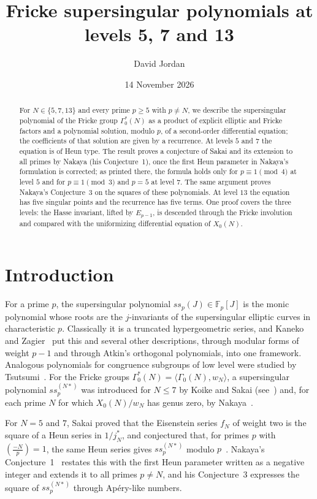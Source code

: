 \documentclass[11pt,a4paper]{article}
\title{Fricke supersingular polynomials at levels 5, 7 and 13}
\author{David Jordan}
\date{14 November 2026}
\theoremstyle{definition}
\theoremstyle{remark}
\newcommand{\F}{\mathbb{F}}
\newcommand{\leg}[2]{\left(\frac{#1}{#2}\right)}
\newcommand{\ssp}{\mathit{ss}_p}
\numberwithin{equation}{section}
\begin{document}
\maketitle

\begin{abstract}
For $N\in\{5,7,13\}$ and every prime $p\ge5$ with $p\ne N$, we describe the
supersingular polynomial of the Fricke group $\Gamma_0^*(N)$ as a product of
explicit elliptic and Fricke factors and a polynomial solution, modulo $p$, of a
second-order differential equation; the coefficients of that solution are given
by a recurrence. At levels $5$ and $7$ the equation is of Heun type. The
result proves a conjecture of Sakai and its extension to all primes by Nakaya
(his Conjecture~1), once the first Heun parameter in Nakaya's formulation is
corrected; as printed there, the formula holds only for $p\equiv1\pmod4$ at
level $5$ and for $p\equiv1\pmod3$ and $p=5$ at level $7$. The same
argument proves Nakaya's Conjecture~3 on the squares of these polynomials. At
level $13$ the equation has five singular points and the recurrence has five
terms. One proof covers the three levels: the Hasse invariant, lifted by
$E_{p-1}$, is descended through the Fricke involution and compared with the
uniformizing differential equation of $X_0(N)$.
\end{abstract}

\section{Introduction}\label{sec:intro}

For a prime $p$, the supersingular polynomial $\ssp(J)\in\F_p[J]$ is the monic
polynomial whose roots are the $j$-invariants of the supersingular elliptic
curves in characteristic $p$. Classically it is a truncated hypergeometric
series, and Kaneko and Zagier~\cite{KZ} put this and several other descriptions,
through modular forms of weight $p-1$ and through Atkin's orthogonal
polynomials, into one framework. Analogous polynomials for congruence subgroups
of low level were studied by Tsutsumi~\cite{Tsutsumi}. For the Fricke groups
$\Gamma_0^*(N)=\langle\Gamma_0(N),w_N\rangle$, a supersingular polynomial
$\ssp^{(N*)}$ was introduced for $N\le7$ by Koike and
Sakai (see~\cite{Sakai11,Sakai14}) and, for each prime $N$ for which
$X_0(N)/w_N$ has genus zero, by Nakaya~\cite{Nakaya19}.

For $N=5$ and $7$, Sakai proved that the Eisenstein series $f_N$ of weight two
is the square of a Heun series in $1/j_N^*$, and conjectured that, for primes
$p$ with $\leg{-N}{p}=1$, the same Heun series gives $\ssp^{(N*)}$ modulo
$p$~\cite[Proposition~3.1 and Conjecture~5.2]{Sakai14}. Nakaya's
Conjecture~1~\cite[pp.~488--489]{Nakaya19} restates this with the first Heun
parameter written as a negative integer and extends it to all primes $p\ne N$,
and his Conjecture~3 expresses the square of $\ssp^{(N*)}$ through Ap\'ery-like
numbers.
\end{document}
